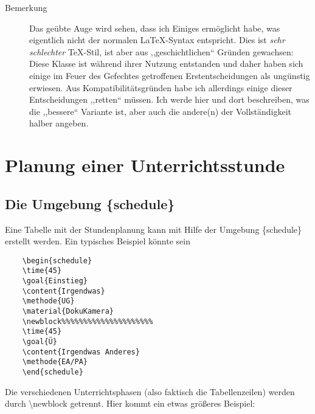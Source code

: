 \documentclass[hyperworksheet]{drcschool}
\newcommand*{\cs}[1]{\textup{\ttfamily\textbackslash#1}}                   %
\newcommand*{\env}[1]{\textup{\ttfamily\{#1\}}}                            %
\begin{document}
\begin{description}
\item[Bemerkung]
Das geübte Auge wird sehen, dass ich Einiges ermöglicht habe, was eigentlich
nicht der normalen \LaTeX-Syntax entspricht.
Dies ist \emph{sehr schlechter} \TeX-Stil,
ist aber aus ,,geschichtlichen`` Gründen gewachsen: Diese Klasse ist während ihrer Nutzung
entstanden und daher haben sich einige im Feuer des Gefechtes getroffenen
Erstentscheidungen als ungünstig erwiesen. Aus Kompatibilitätsgründen habe
ich allerdings einige dieser Entscheidungen ,,retten`` müssen. Ich werde
hier und dort beschreiben, was die ,,bessere`` Variante ist, aber auch die andere(n)
der Vollständigkeit halber angeben.
\end{description}

\section{Planung einer Unterrichtsstunde}
\subsection{Die Umgebung \{schedule\}}
Eine Tabelle mit der Stundenplanung kann mit Hilfe der Umgebung  \env{schedule} erstellt werden.
Ein typisches Beispiel könnte sein
\begin{verbatim}
    \begin{schedule}
    \time{45}
    \goal{Einstieg}
    \content{Irgendwas}
    \methode{UG}
    \material{DokuKamera}
    \newblock%%%%%%%%%%%%%%%%%%%%%
    \time{45}
    \goal{Ü}
    \content{Irgendwas Anderes}
    \methode{EA/PA}
    \end{schedule}
\end{verbatim}
Die verschiedenen Unterrichtsphasen (also faktisch die Tabellenzeilen) werden durch \cs{newblock}
getrennt. Hier kommt ein etwas größeres Beispiel:

\end{document}
